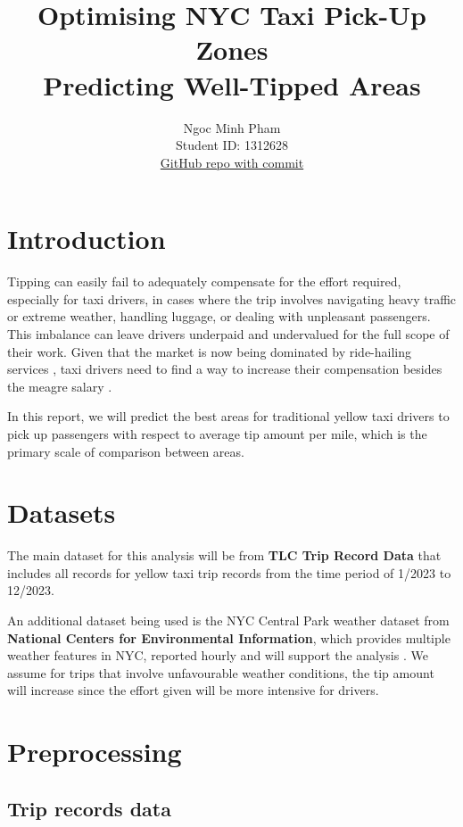 \documentclass[11pt]{article}
\title{\textbf{Optimising NYC Taxi Pick-Up Zones} \\  Predicting Well-Tipped Areas}
\author{
Ngoc Minh Pham \\
Student ID: 1312628 \\
\href{https://github.com/MAST30034-AppliedDataScience/project-1-individual-pnminh-unimelb}{GitHub repo with commit}
}
\begin{document}
\maketitle

\section{Introduction}

Tipping can easily fail to adequately compensate for the effort required, especially for taxi drivers, in cases where the trip involves navigating heavy traffic or extreme weather, handling luggage, or dealing with unpleasant passengers. This imbalance can leave drivers underpaid and undervalued for the full scope of their work. Given that the market is now being dominated by ride-hailing services \cite{ride_hailing_domination}, taxi drivers need to find a way to increase their compensation besides the meagre salary \cite{taxi_driver_salary}.

In this report, we will predict the best areas for traditional yellow taxi drivers to pick up passengers with respect to average tip amount per mile, which is the primary scale of comparison between areas.

\section{Datasets}

The main dataset for this analysis will be from \textbf{TLC Trip Record Data} that includes all records for yellow taxi trip records from the time period of 1/2023 to 12/2023.

An additional dataset being used is the NYC Central Park weather dataset from \textbf{National Centers for Environmental Information}, which provides multiple weather features in NYC, reported hourly and will support the analysis \cite{weather_data}. We assume for trips that involve unfavourable weather conditions, the tip amount will increase since the effort given will be more intensive for drivers. 

\section{Preprocessing}

\subsection{Trip records data}
\end{document}
